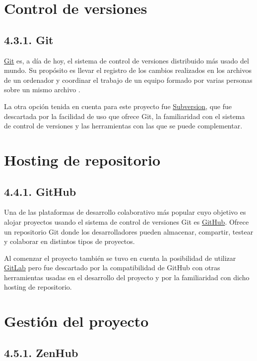 \section{Control de versiones}

\subsection{4.3.1. Git}

\href{https://git-scm.com/}{Git} es, a día de hoy, el sistema de control de versiones distribuido más usado del mundo. Su propósito es llevar el registro de los cambios realizados en los archivos de un ordenador y coordinar el trabajo de un equipo formado por varias personas sobre un mismo archivo \cite{web:Git}.

La otra opción tenida en cuenta para este proyecto fue \href{https://subversion.apache.org/}{Subversion}, que fue descartada por la facilidad de uso que ofrece Git, la familiaridad con el sistema de control de versiones y las herramientas con las que se puede complementar.

\section{Hosting de repositorio}

\subsection{4.4.1. GitHub}

Una de las plataformas de desarrollo colaborativo más popular cuyo objetivo es alojar proyectos usando el sistema de control de versiones Git es \href{https://github.com/}{GitHub}. Ofrece un repositorio Git donde los desarrolladores pueden almacenar, compartir, testear y colaborar en distintos tipos de proyectos.

Al comenzar el proyecto también se tuvo en cuenta la posibilidad de utilizar \href{https://about.gitlab.com/}{GitLab} pero fue descartado por la compatibilidad de GitHub con otras herramientas usadas en el desarrollo del proyecto y por la familiaridad con dicho hosting de repositorio.

\section{Gestión del proyecto }

\subsection{4.5.1. ZenHub}

